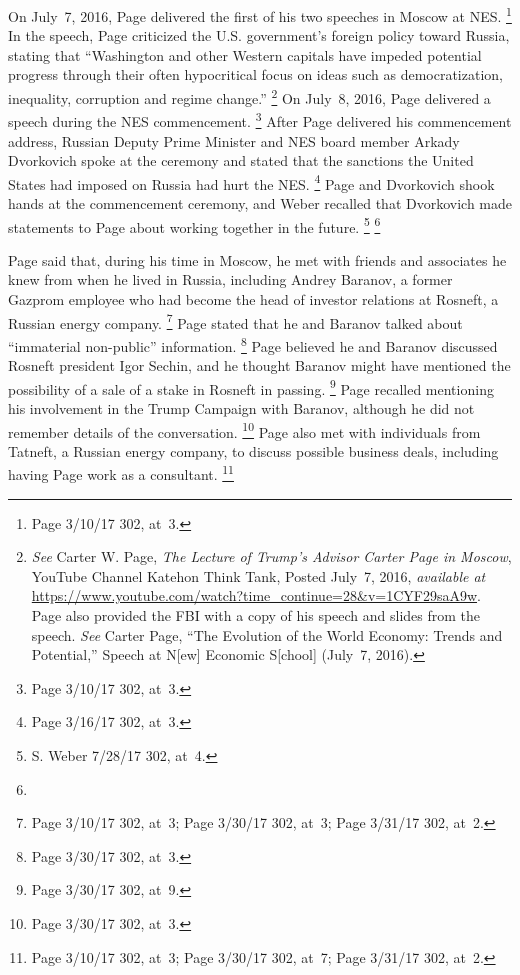 On July~7, 2016, Page delivered the first of his two speeches in Moscow at NES.%
\footnote{Page 3/10/17 302, at~3.}
In the speech, Page criticized the U.S. government's foreign policy toward Russia, stating that ``Washington and other Western capitals have impeded potential progress through their often hypocritical focus on ideas such as democratization, inequality, corruption and regime change.''%
\footnote{\textit{See} Carter W. Page, \textit{The Lecture of Trump's Advisor Carter Page in Moscow}, YouTube Channel Katehon Think Tank, Posted July~7, 2016,
\textit{available at} \url{https://www.youtube.com/watch?time\_continue=28\&v=1CYF29saA9w}.
Page also provided the FBI with a copy of his speech and slides from the speech.
\textit{See} Carter Page, ``The Evolution of the World Economy: Trends and Potential,'' Speech at N[ew] Economic S[chool] (July~7, 2016).}
On July~8, 2016, Page delivered a speech during the NES commencement.%
\footnote{Page 3/10/17 302, at~3.}
After Page delivered his commencement address, Russian Deputy Prime Minister and NES board member Arkady Dvorkovich spoke at the ceremony and stated that the sanctions the United States had imposed on Russia had hurt the NES\null.%
\footnote{Page 3/16/17 302, at~3.}
Page and Dvorkovich shook hands at the commencement ceremony, and Weber recalled that Dvorkovich made statements to Page about working together in the future.%
\footnote{S. Weber 7/28/17 302, at~4.}
\footnote{}

Page said that, during his time in Moscow, he met with friends and associates he knew from when he lived in Russia, including Andrey Baranov, a former Gazprom employee who had become the head of investor relations at Rosneft, a Russian energy company.%
\footnote{Page 3/10/17 302, at~3;
Page 3/30/17 302, at~3;
Page 3/31/17 302, at~2.}
Page stated that he and Baranov talked about ``immaterial non-public'' information.%
\footnote{Page 3/30/17 302, at~3.}
Page believed he and Baranov discussed Rosneft president Igor Sechin, and he thought Baranov might have mentioned the possibility of a sale of a stake in Rosneft in passing.%
\footnote{Page 3/30/17 302, at~9. }
Page recalled mentioning his involvement in the Trump Campaign with Baranov, although he did not remember details of the conversation.%
\footnote{ Page 3/30/17 302, at~3.}
Page also met with individuals from Tatneft, a Russian energy company, to discuss possible business deals, including having Page work as a consultant.%
\footnote{Page 3/10/17 302, at~3;
Page 3/30/17 302, at~7;
Page 3/31/17 302, at~2.}

